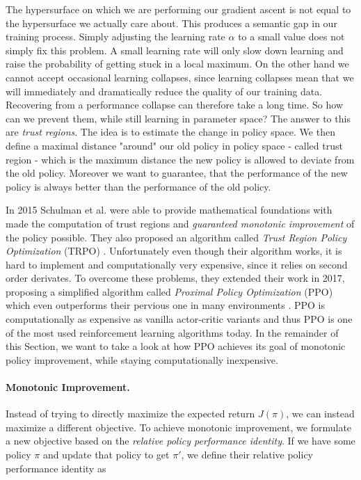 The hypersurface on which we are performing our gradient ascent is not equal to the hypersurface we actually care about. This produces a semantic gap in our training process. Simply adjusting the learning rate $\alpha$ to a small value does not simply fix this problem. A small learning rate will only slow down learning and raise the probability of getting stuck in a local maximum. On the other hand we cannot accept occasional learning collapses, since learning collapses mean that we will immediately and dramatically reduce the quality of our training data. Recovering from a performance collapse can therefore take a long time. So how can we prevent them, while still learning in parameter space? The answer to this are \textit{trust regions}. The idea is to estimate the change in policy space. We then define a maximal distance "around" our old policy in policy space - called trust region - which is the maximum distance the new policy is allowed to deviate from the old policy. Moreover we want to guarantee, that the performance of the new policy is always better than the performance of the old policy.

In 2015 Schulman et al. were able to provide mathematical foundations with made the computation of trust regions and \textit{guaranteed monotonic improvement} of the policy possible. They also proposed an algorithm called \textit{Trust Region Policy Optimization} (TRPO) \cite{schulman2015trust}. Unfortunately even though their algorithm works, it is hard to implement and computationally very expensive, since it relies on second order derivates. To overcome these problems, they extended their work in 2017, proposing a simplified algorithm called \textit{Proximal Policy Optimization} (PPO) which even outperforms their pervious one in many environments \cite{schulman2017proximal}. PPO is computationally as expensive as vanilla actor-critic variants and thus PPO is one of the most used reinforcement learning algorithms today. In the remainder of this Section, we want to take a look at how PPO achieves its goal of monotonic policy improvement, while staying computationally inexpensive.

\paragraph{Monotonic Improvement.}
Instead of trying to directly maximize the expected return $J(\pi)$, we can instead maximize a different objective. To achieve monotonic improvement, we formulate a new objective based on the \textit{relative policy performance identity}. If we have some policy $\pi$ and update that policy to get $\pi'$, we define their relative policy performance identity as

